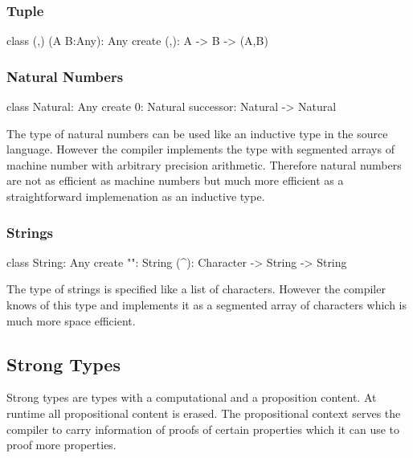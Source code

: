 \subsubsection{Tuple}

\begin{alba}
  class
    (,) (A B:Any): Any
  create
    (,):    A -> B -> (A,B)
\end{alba}
\vskip 2mm




\subsubsection{Natural Numbers}

\begin{alba}
  class
    Natural: Any
  create
    0: Natural
    successor: Natural -> Natural
\end{alba}

The type of natural numbers can be used like an inductive type in the source
language. However the compiler implements the type with segmented arrays of
machine number with arbitrary precision arithmetic. Therefore natural numbers
are not as efficient as machine numbers but much more efficient as a
straightforward implemenation as an inductive type.
\newline



\subsubsection{Strings}

\begin{alba}
  class
    String: Any
  create
    "": String
    (^): Character -> String -> String
\end{alba}

The type of strings is specified like a list of characters. However the
compiler knows of this type and implements it as a segmented array of
characters which is much more space efficient.
\newline




\subsection{Strong Types}
\label{sec:prelude-strong-types}

Strong types are types with a computational and a proposition content. At
runtime all propositional content is erased. The propositional context serves
the compiler to carry information of proofs of certain properties which it can
use to proof more properties.



